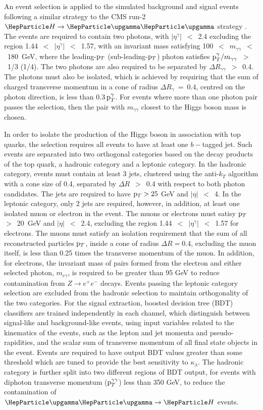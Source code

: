 
An event selection is applied to the simulated background and signal events following a similar strategy to the CMS run-2 $\hgg$ strategy \cite{Sirunyan:2018ouh}. The events are required to contain two photons, with $|\eta^\gamma|$~$<$~2.4 excluding the region 1.44~$<$~$|\eta^\gamma|$~$<$~1.57, with an invariant mass satisfying 100~$<$~$m_{\gamma\gamma}$~$<$~180~GeV, where the leading-$\mathrm{p}_{T}$ (sub-leading-$\mathrm{p}_{T}$) photon satisfies $\mathrm{p}_{T}^{\gamma}/m_{\gamma\gamma}$~$>$~1/3 (1/4). The two photons are also required to be separated by $\Delta R_{\gamma\gamma}$~$>$~0.4. The photons must also be isolated, which is achieved by requiring that the sum of charged transverse momentum in a cone of radius $\Delta R_{\gamma}$~=~0.4, centred on the photon direction, is less than 0.3$\, \mathrm{p}_{T}^\gamma$. For events where more than one photon pair passes the selection, then the pair with $m_{\gamma\gamma}$ closest to the Higgs boson mass is chosen.

In order to isolate the production of the Higgs boson in association with top quarks, the selection requires all events to have at least one $b-$tagged jet. Such events are separated into two orthogonal categories based on the decay products of the top quark, a hadronic category and a leptonic category. In the hadronic category, events must contain at least 3 jets, clustered using the anti-$k_{T}$ algorithm with a cone size of 0.4, separated by $\Delta R$~$>$~0.4 with respect to both photon candidates. The jets are required to have $\mathrm{p}_{T}>25$ GeV and $|\eta|$~$<$~4. In the leptonic category, only 2 jets are required, however, in addition, at least one isolated muon or electron in the event. The muons or electrons must satisy $\mathrm{p}_{T}$~$>$~20~GeV and $|\eta|$~$<$~2.4, excluding the region 1.44~$<$~$|\eta^\gamma|$~$<$~1.57 for electrons. The muons must satisfy an isolation requirement that the sum of all reconstructed particles $\mathrm{p}_{T}$, inside a cone of radius $\Delta R=0.4$, excluding the muon itself, is less than 0.25 times the transverse momentum of the muon. In addition, for electrons, the invariant mass of pairs formed from the electron and either selected photon, $m_{e\gamma}$, is required to be greater than 95 GeV to reduce contamination from $Z\rightarrow e^{+}e^{-}$ decays. Events passing the leptonic category selection are excluded from the hadronic selection to maintain orthogonality of the two categories.  
For the signal extraction, boosted decision tree (BDT) classifiers are trained independently in each channel, which distinguish between signal-like and background-like events, using input variables related to the kinematics of the events, such as the lepton and jet momenta and pseudo-rapidities, and the scalar sum of transverse momentum of all final state objects in the event. Events are required to have output BDT values greater than some threshold which are tuned to provide the best sensitivity to $\kappa_{\lambda}$. The hadronic category is further split into two different regions of BDT output, for events with diphoton transverse momentum ($\mathrm{p}_{T}^{\gamma\gamma}$) less than 350 GeV, to reduce the contamination of $\ggH$ events. 

